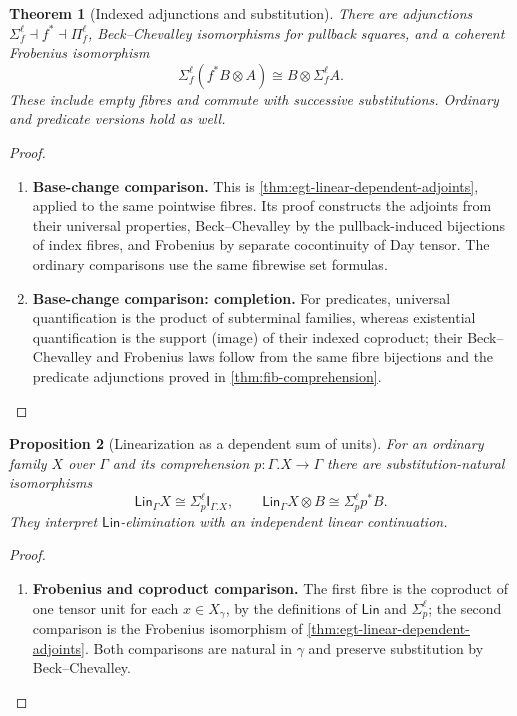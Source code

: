 \documentclass[11pt,a4paper]{article}
\numberwithin{equation}{section}
\newtheorem{theorem}{Theorem}[section]
\newtheorem{proposition}[theorem]{Proposition}
\theoremstyle{definition}
\theoremstyle{remark}
\theoremstyle{plain}
\providecommand{\Lin}{\mathsf{Lin}}
\providecommand{\I}{\mathsf{I}}
\begin{document}
\begin{theorem}[Indexed adjunctions and substitution]
\label{agt-thm-indexed}
There are adjunctions $\Sigma_f^\ell\dashv f^*\dashv\Pi_f^\ell$,
Beck--Chevalley isomorphisms for pullback squares, and a coherent
Frobenius isomorphism
\[
 \Sigma_f^\ell(f^*B\otimes A)\cong B\otimes\Sigma_f^\ell A.
\]
These include empty fibres and commute with successive substitutions.
Ordinary and predicate versions hold as well.
\end{theorem}
\begin{proof}
\leavevmode
\begin{enumerate}[label=\textup{(\arabic*)},leftmargin=*,itemsep=4pt,topsep=3pt]
  \item \textbf{Base-change comparison.} This is \cref{thm:egt-linear-dependent-adjoints}, applied to the same
pointwise fibres. Its proof constructs the adjoints from their universal
properties, Beck--Chevalley by the pullback-induced bijections of index
fibres, and Frobenius by separate cocontinuity of Day tensor. The ordinary comparisons use the same fibrewise set formulas.
  \item \textbf{Base-change comparison: completion.} For
predicates, universal quantification is the product of subterminal
families, whereas existential quantification is the support (image)
of their indexed coproduct; their Beck--Chevalley and Frobenius laws
follow from the same fibre bijections and the predicate adjunctions
proved in \cref{thm:fib-comprehension}.
\end{enumerate}
\end{proof}

\begin{proposition}[Linearization as a dependent sum of units]
\label{agt-prop-lin-dependent-sum}
For an ordinary family $X$ over $\Gamma$ and its comprehension
$p:\Gamma.X\to\Gamma$ there are substitution-natural isomorphisms
\[
 \Lin_\Gamma X\cong\Sigma_p^\ell\I_{\Gamma.X},\qquad
 \Lin_\Gamma X\otimes B\cong\Sigma_p^\ell p^*B.
\]
They interpret $\Lin$-elimination with an independent linear continuation.
\end{proposition}
\begin{proof}
\leavevmode
\begin{enumerate}[label=\textup{(\arabic*)},leftmargin=*,itemsep=4pt,topsep=3pt]
  \item \textbf{Frobenius and coproduct comparison.} The first fibre is the coproduct of one tensor unit for each
$x\in X_\gamma$, by the definitions of $\Lin$ and $\Sigma_p^\ell$;
the second comparison is the Frobenius isomorphism of
\cref{thm:egt-linear-dependent-adjoints}. Both comparisons are
natural in $\gamma$ and preserve substitution by Beck--Chevalley.
\end{enumerate}
\end{proof}
\end{document}
